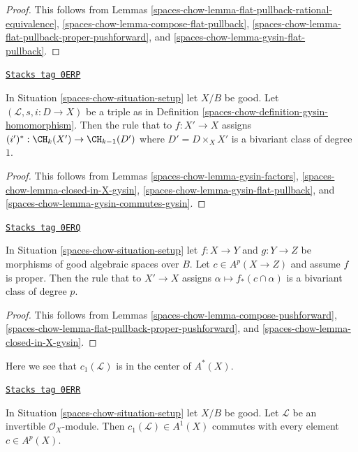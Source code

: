 \begin{proof}
This follows from
Lemmas \ref{spaces-chow-lemma-flat-pullback-rational-equivalence},
\ref{spaces-chow-lemma-compose-flat-pullback},
\ref{spaces-chow-lemma-flat-pullback-proper-pushforward}, and
\ref{spaces-chow-lemma-gysin-flat-pullback}.
\end{proof}

\begin{lemma}
\label{spaces-chow-lemma-gysin-bivariant}
\href{https://stacks.math.columbia.edu/tag/0ERP}{\texttt{Stacks tag 0ERP}}

In Situation \ref{spaces-chow-situation-setup} let $X/B$ be good.
Let $(\mathcal{L}, s, i : D \to X)$ be a triple as in
Definition \ref{spaces-chow-definition-gysin-homomorphism}.
Then the rule that to $f : X' \to X$ assigns
$(i')^* : \CH_k(X') \to \CH_{k - 1}(D')$ where $D' = D \times_X X'$
is a bivariant class of degree $1$.
\end{lemma}

\begin{proof}
This follows from Lemmas \ref{spaces-chow-lemma-gysin-factors},
\ref{spaces-chow-lemma-closed-in-X-gysin},
\ref{spaces-chow-lemma-gysin-flat-pullback}, and
\ref{spaces-chow-lemma-gysin-commutes-gysin}.
\end{proof}

\begin{lemma}
\label{spaces-chow-lemma-push-proper-bivariant}
\href{https://stacks.math.columbia.edu/tag/0ERQ}{\texttt{Stacks tag 0ERQ}}

In Situation \ref{spaces-chow-situation-setup} let $f : X \to Y$ and
$g : Y \to Z$ be morphisms of good algebraic spaces over $B$.
Let $c \in A^p(X \to Z)$ and assume $f$ is proper.
Then the rule that to $X' \to X$ assigns
$\alpha \longmapsto f_*(c \cap \alpha)$
is a bivariant class of degree $p$.
\end{lemma}

\begin{proof}
This follows from Lemmas \ref{spaces-chow-lemma-compose-pushforward},
\ref{spaces-chow-lemma-flat-pullback-proper-pushforward}, and
\ref{spaces-chow-lemma-closed-in-X-gysin}.
\end{proof}

Here we see that $c_1(\mathcal{L})$ is in the center of $A^*(X)$.

\begin{lemma}[C1 center]
\label{spaces-chow-lemma-c1-center}
\href{https://stacks.math.columbia.edu/tag/0ERR}{\texttt{Stacks tag 0ERR}}

In Situation \ref{spaces-chow-situation-setup} let $X/B$ be good.
Let $\mathcal{L}$ be an invertible $\mathcal{O}_X$-module.
Then $c_1(\mathcal{L}) \in A^1(X)$ commutes with every
element $c \in A^p(X)$.
\end{lemma}

